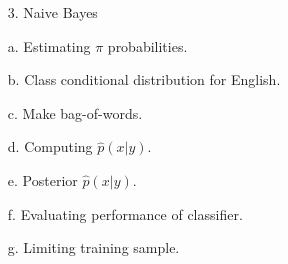 \documentclass[12pt]{report}
\begin{document}
\begin{enumerate}
\item[3.] Naive Bayes
\item[a.] Estimating \( \pi \) probabilities.
\item[b.] Class conditional distribution for English.
\item[c.] Make bag-of-words.
\item[d.] Computing \( \hat{p}(x | y) \).
\item[e.] Posterior \( \hat{p}(x | y) \).
\item[f.] Evaluating performance of classifier.
\item[g.] Limiting training sample.













\end{enumerate}
\end{document}
